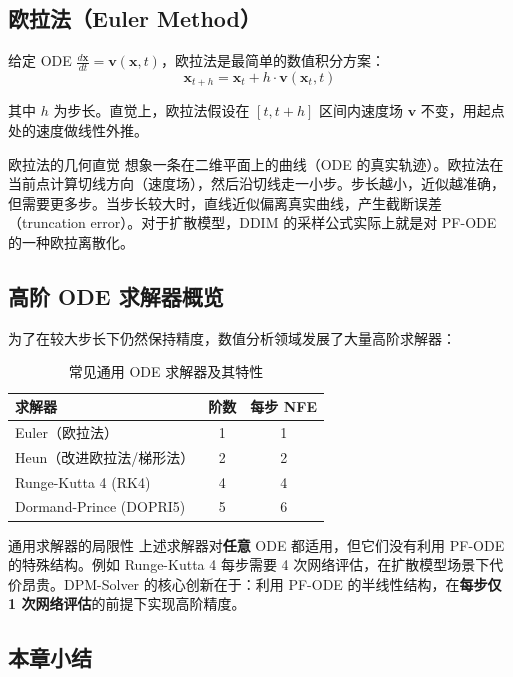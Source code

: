 \documentclass[a4paper]{article}
\begin{document}
\subsection{欧拉法（Euler Method）}

给定 ODE $\frac{d\mathbf{x}}{dt} = \mathbf{v}(\mathbf{x}, t)$，欧拉法是最简单的数值积分方案：
$$\mathbf{x}_{t+h} = \mathbf{x}_t + h \cdot \mathbf{v}(\mathbf{x}_t, t)$$

其中 $h$ 为步长。直觉上，欧拉法假设在 $[t, t+h]$ 区间内速度场 $\mathbf{v}$ 不变，用起点处的速度做线性外推。

\begin{knowledgebox}{欧拉法的几何直觉}
想象一条在二维平面上的曲线（ODE 的真实轨迹）。欧拉法在当前点计算切线方向（速度场），然后沿切线走一小步。步长越小，近似越准确，但需要更多步。当步长较大时，直线近似偏离真实曲线，产生截断误差（truncation error）。对于扩散模型，DDIM 的采样公式实际上就是对 PF-ODE 的一种欧拉离散化。
\end{knowledgebox}

\subsection{高阶 ODE 求解器概览}

为了在较大步长下仍然保持精度，数值分析领域发展了大量高阶求解器：

\begin{table}[H]
\centering
\begin{tabular}{lcc}
\toprule
\textbf{求解器} & \textbf{阶数} & \textbf{每步 NFE} \\
\midrule
Euler（欧拉法） & 1 & 1 \\
Heun（改进欧拉法/梯形法） & 2 & 2 \\
Runge-Kutta 4 (RK4) & 4 & 4 \\
Dormand-Prince (DOPRI5) & 5 & 6 \\
\bottomrule
\end{tabular}
\caption{常见通用 ODE 求解器及其特性}
\end{table}

\begin{warningbox}{通用求解器的局限性}
上述求解器对\textbf{任意} ODE 都适用，但它们没有利用 PF-ODE 的特殊结构。例如 Runge-Kutta 4 每步需要 4 次网络评估，在扩散模型场景下代价昂贵。DPM-Solver 的核心创新在于：利用 PF-ODE 的半线性结构，在\textbf{每步仅 1 次网络评估}的前提下实现高阶精度。
\end{warningbox}

\subsection{本章小结}
\end{document}
